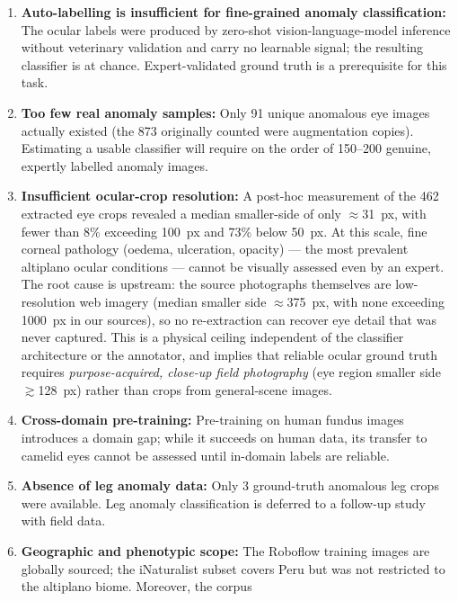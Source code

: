 \documentclass[journal=animals,article=article,submit=mdpi,moreauthors=true,pdftex]{mdpi}
\begin{document}
\begin{enumerate}
  \item \textbf{Auto-labelling is insufficient for fine-grained anomaly classification:}
        The ocular labels were produced by zero-shot vision-language-model inference without
        veterinary validation and carry no learnable signal; the resulting classifier
        is at chance. Expert-validated ground truth is a prerequisite for this task.
  \item \textbf{Too few real anomaly samples:}
        Only 91 unique anomalous eye images actually existed (the 873 originally counted
        were augmentation copies). Estimating a usable classifier will require on the
        order of 150--200 genuine, expertly labelled anomaly images.
  \item \textbf{Insufficient ocular-crop resolution:}
        A post-hoc measurement of the 462 extracted eye crops revealed a median
        smaller-side of only $\approx$31~px, with fewer than 8\% exceeding 100~px and
        73\% below 50~px. At this scale, fine corneal pathology (oedema, ulceration,
        opacity) --- the most prevalent altiplano ocular conditions --- cannot be
        visually assessed even by an expert. The root cause is upstream: the source
        photographs themselves are low-resolution web imagery (median smaller side
        $\approx$375~px, with none exceeding 1000~px in our sources), so no re-extraction
        can recover eye detail that was never captured. This is a physical ceiling
        independent of the classifier architecture or the annotator, and implies that
        reliable ocular ground truth requires \emph{purpose-acquired, close-up field
        photography} (eye region smaller side $\gtrsim$128~px) rather than crops from
        general-scene images.
  \item \textbf{Cross-domain pre-training:}
        Pre-training on human fundus images introduces a domain gap; while it succeeds
        on human data, its transfer to camelid eyes cannot be assessed until in-domain
        labels are reliable.
  \item \textbf{Absence of leg anomaly data:}
        Only 3 ground-truth anomalous leg crops were available.
        Leg anomaly classification is deferred to a follow-up study with field data.
  \item \textbf{Geographic and phenotypic scope:}
        The Roboflow training images are globally sourced; the iNaturalist subset
        covers Peru but was not restricted to the altiplano biome. Moreover, the corpus

\end{enumerate}
\end{document}
